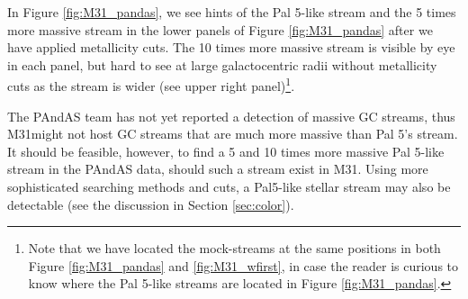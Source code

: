 \documentclass[twocolumn]{aastex62}
\begin{document}
In Figure \ref{fig:M31_pandas}, we see hints of the Pal 5-like stream and the 5 times more massive stream in the lower panels of Figure \ref{fig:M31_pandas} after we have applied metallicity cuts. The 10 times more massive stream is visible by eye in each panel, but hard to see at large galactocentric radii without metallicity cuts as the stream is wider (see upper right panel)\footnote{Note that we have located the mock-streams at the same positions in both Figure \ref{fig:M31_pandas} and \ref{fig:M31_wfirst}, in case the reader is curious to know where the Pal 5-like streams are located in Figure \ref{fig:M31_pandas}.}.

The PAndAS team has not yet reported a detection of massive GC streams, thus M31might not host GC streams that are much more massive than Pal 5's stream. It should be feasible, however, to find a 5 and 10 times more massive Pal 5-like stream in the PAndAS data, should such a stream exist in M31. Using more sophisticated searching methods and cuts, a Pal5-like stellar stream may also be detectable (see the discussion in Section \ref{sec:color}).
\end{document}
